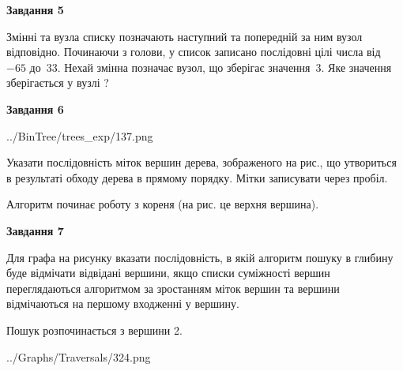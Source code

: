 \documentclass[12pt, ukrainian]{article}
\begin{document}
{\begin {large}
{\begin {center}\textbf{Завдання 5}\end {center}}\par
Змінні  та  вузла списку позначають наступний та попередній за ним вузол відповідно. Починаючи з голови, у список записано послідовні цілі числа від~$-65$ до~$33$. Нехай змінна  позначає вузол, що зберігає значення~$3$.
Яке значення зберігається у вузлі  ?\par
\newpage

{\begin {center}\textbf{Завдання 6}\end {center}}\par

\begin{center}
	{../BinTree/trees_exp/137.png}
\end{center}
Указати послідовність міток вершин дерева, зображеного на рис., що утвориться в результаті обходу дерева в прямому порядку. Мітки записувати через пробіл.\par Алгоритм починає роботу з кореня (на рис. це верхня вершина).\par
\newpage

{\begin {center}\textbf{Завдання 7}\end {center}}\par
Для графа на рисунку вказати послідовність, в якій алгоритм пошуку в глибину буде відмічати відвідані вершини, якщо списки суміжності вершин переглядаються алгоритмом за зростанням міток вершин та вершини відмічаються на першому вход\-женні у вершину.\par
Пошук розпочинається з вершини 2.\par

\begin{center}
	{../Graphs/Traversals/324.png}
\end{center}\par
\newpage


\end{large}}
\end{document}
